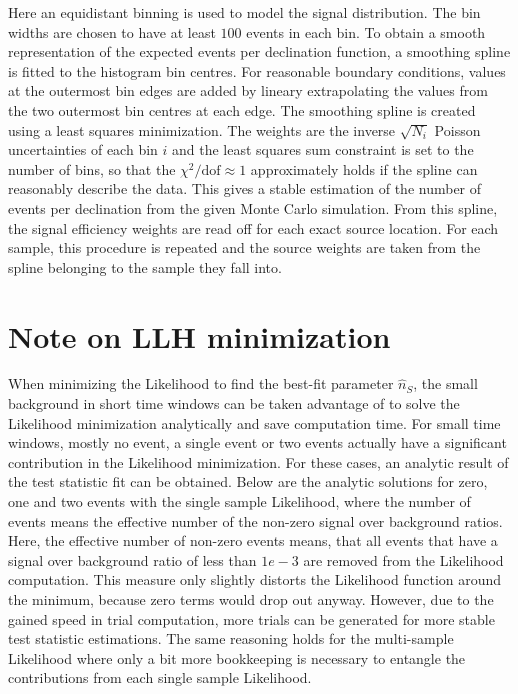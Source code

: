 Here an equidistant binning is used to model the signal distribution.
The bin widths are chosen to have at least $100$ events in each bin.
To obtain a smooth representation of the expected events per declination function, a smoothing spline is fitted to the histogram bin centres.
For reasonable boundary conditions, values at the outermost bin edges are added by lineary extrapolating the values from the two outermost bin centres at each edge.
The smoothing spline is created using a least squares minimization.
The weights are the inverse $\sqrt{N_i}$ Poisson uncertainties of each bin $i$ and the least squares sum constraint is set to the number of bins, so that the $\chi^2 / \text{dof} \approx 1$ approximately holds if the spline can reasonably describe the data.
This gives a stable estimation of the number of events per declination from the given Monte Carlo simulation.
From this spline, the signal efficiency weights are read off for each exact source location.
For each sample, this procedure is repeated and the source weights are taken from the spline belonging to the sample they fall into.


\section{Note on LLH minimization}
When minimizing the Likelihood to find the best-fit parameter $\hat{n}_S$, the small background in short time windows can be taken advantage of to solve the Likelihood minimization analytically and save computation time.
For small time windows, mostly no event, a single event or two events actually have a significant contribution in the Likelihood minimization.
For these cases, an analytic result of the test statistic fit can be obtained.
Below are the analytic solutions for zero, one and two events with the single sample Likelihood, where the number of events means the effective number of the non-zero signal over background ratios.
Here, the effective number of non-zero events means, that all events that have a signal over background ratio of less than $\si{1e-3}$ are removed from the Likelihood computation.
This measure only slightly distorts the Likelihood function around the minimum, because zero terms would drop out anyway.
However, due to the gained speed in trial computation, more trials can be generated for more stable test statistic estimations.
The same reasoning holds for the multi-sample Likelihood where only a bit more bookkeeping is necessary to entangle the contributions from each single sample Likelihood.

